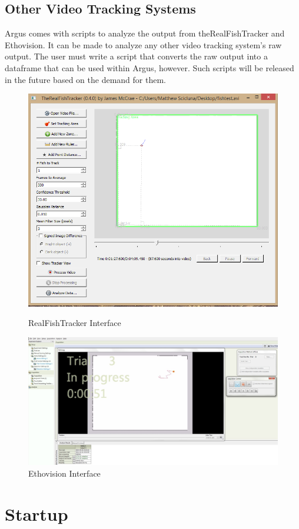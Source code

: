 \documentclass[12pt,titlepage]{report}
\begin{document}
\section{Other Video Tracking Systems}
Argus comes with scripts to analyze the output from theRealFishTracker and Ethovision. It can be made to analyze any other video tracking system's raw output. The user must write a script that converts the raw output into a dataframe that can be used within Argus, however. Such scripts will be released in the future based on the demand for them.


\begin{figure}[ht!]
\centering
\includegraphics[width=120mm]{image12.png}
\caption{RealFishTracker Interface}
\label{overflow}
\centering
\includegraphics[width=120mm]{image14.png}
\caption{Ethovision Interface}
\label{overflow}
\end{figure}

\chapter{Startup}
\end{document}
